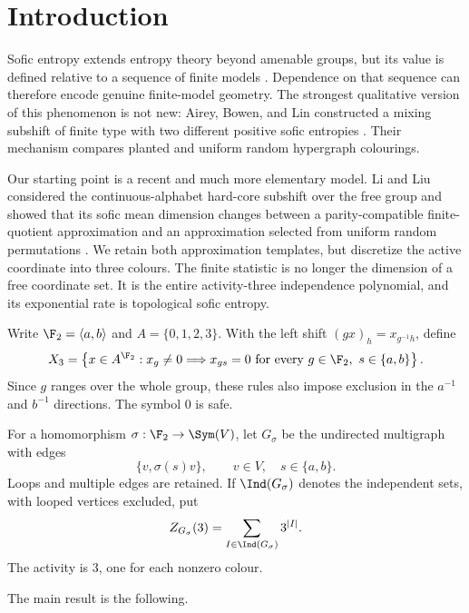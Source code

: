 \section{Introduction}

Sofic entropy extends entropy theory beyond amenable groups, but its value is
defined relative to a sequence of finite models
\citep{KerrLi2011,KerrLi2013}.  Dependence on that sequence can therefore
encode genuine finite-model geometry.  The strongest qualitative version of
this phenomenon is not new: Airey, Bowen, and Lin constructed a mixing
subshift of finite type with two different positive sofic entropies
\citep{AireyBowenLin2022}.  Their mechanism compares planted and uniform
random hypergraph colourings.

Our starting point is a recent and much more elementary model.  Li and Liu
considered the continuous-alphabet hard-core subshift over the free group and
showed that its sofic mean dimension changes between a parity-compatible
finite-quotient approximation and an approximation selected from uniform
random permutations \citep{LiLiu2026}.  We retain both approximation
templates, but discretize the active coordinate into three colours.  The
finite statistic is no longer the dimension of a free coordinate set.  It is
the entire activity-three independence polynomial, and its exponential rate
is topological sofic entropy.

Write $\F_2=\langle a,b\rangle$ and $A=\{0,1,2,3\}$.  With the left shift
$(g x)_h=x_{g^{-1}h}$, define
\begin{equation}\label{eq:X3}
 X_3=\left\{x\in A^{\F_2}:
 x_g\ne0\Longrightarrow x_{gs}=0
 \text{ for every }g\in\F_2,
 \ s\in\{a,b\}\right\}.
\end{equation}
Since $g$ ranges over the whole group, these rules also impose exclusion in
the $a^{-1}$ and $b^{-1}$ directions.  The symbol $0$ is safe.

For a homomorphism $\sigma:\F_2\to\Sym(V)$, let $G_\sigma$ be the undirected
multigraph with edges
\[
 \{v,\sigma(s)v\},\qquad v\in V,\quad s\in\{a,b\}.
\]
Loops and multiple edges are retained.  If $\Ind(G_\sigma)$ denotes the
independent sets, with looped vertices excluded, put
\begin{equation}\label{eq:partition}
 Z_{G_\sigma}(3)
 =\sum_{I\in\Ind(G_\sigma)}3^{|I|}.
\end{equation}
The activity is $3$, one for each nonzero colour.

The main result is the following.

